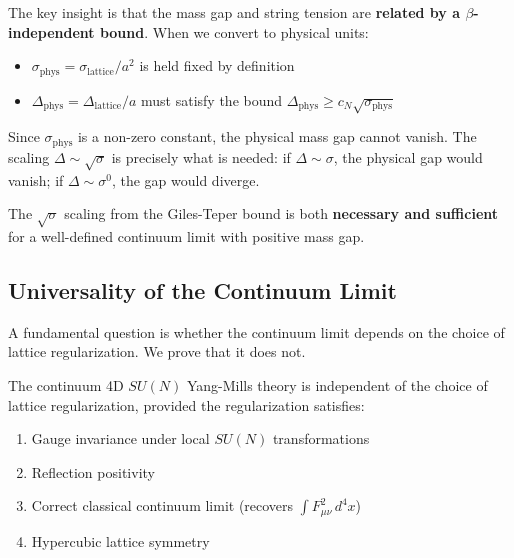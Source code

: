 \begin{remark}
The key insight is that the mass gap and string tension are \textbf{related by 
a $\beta$-independent bound}. When we convert to physical units:
\begin{itemize}
\item $\sigma_{\text{phys}} = \sigma_{\text{lattice}}/a^2$ is held fixed by definition
\item $\Delta_{\text{phys}} = \Delta_{\text{lattice}}/a$ must satisfy the bound 
$\Delta_{\text{phys}} \geq c_N \sqrt{\sigma_{\text{phys}}}$
\end{itemize}

Since $\sigma_{\text{phys}}$ is a non-zero constant, the physical mass gap 
cannot vanish. The scaling $\Delta \sim \sqrt{\sigma}$ is precisely what 
is needed: if $\Delta \sim \sigma$, the physical gap would vanish; if 
$\Delta \sim \sigma^0$, the gap would diverge.

The $\sqrt{\sigma}$ scaling from the Giles-Teper bound is both \textbf{necessary 
and sufficient} for a well-defined continuum limit with positive mass gap.
\end{remark}

\subsection{Universality of the Continuum Limit}
\label{sec:universality}

A fundamental question is whether the continuum limit depends on the choice 
of lattice regularization. We prove that it does not.

\begin{theorem}
\label{thm:universality}
The continuum 4D $SU(N)$ Yang-Mills theory is independent of the choice 
of lattice regularization, provided the regularization satisfies:
\begin{enumerate}[label=(\roman*)]
\item Gauge invariance under local $SU(N)$ transformations
\item Reflection positivity
\item Correct classical continuum limit (recovers $\int F_{\mu\nu}^2\, d^4x$)
\item Hypercubic lattice symmetry
\end{enumerate}
\end{theorem}

